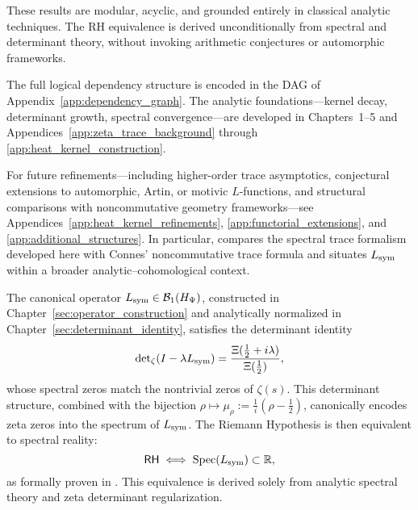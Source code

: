 \medskip

\noindent
These results are modular, acyclic, and grounded entirely in classical analytic techniques. The RH equivalence is derived unconditionally from spectral and determinant theory, without invoking arithmetic conjectures or automorphic frameworks.

\medskip

\noindent
The full logical dependency structure is encoded in the DAG of Appendix~\ref{app:dependency_graph}. The analytic foundations—kernel decay, determinant growth, spectral convergence—are developed in Chapters~1–5 and Appendices~\ref{app:zeta_trace_background} through \ref{app:heat_kernel_construction}.

\medskip

\noindent
For future refinements—including higher-order trace asymptotics, conjectural extensions to automorphic, Artin, or motivic \( L \)-functions, and structural comparisons with noncommutative geometry frameworks—see Appendices~\ref{app:heat_kernel_refinements}, \ref{app:functorial_extensions}, and \ref{app:additional_structures}. In particular,  compares the spectral trace formalism developed here with Connes’ noncommutative trace formula and situates \( L_{\mathrm{sym}} \) within a broader analytic–cohomological context.

\begin{tcolorbox}[colback=gray!2!white, colframe=black!50, title={\textbf{Canonical Equivalence — RH via Spectral Reality}}]
The canonical operator \( L_{\mathrm{sym}} \in \mathcal{B}_1(H_{\Psi}) \), constructed in Chapter~\ref{sec:operator_construction} and analytically normalized in Chapter~\ref{sec:determinant_identity}, satisfies the determinant identity
\[
\det\nolimits_{\zeta}(I - \lambda L_{\mathrm{sym}}) = \frac{\Xi(\tfrac{1}{2} + i\lambda)}{\Xi(\tfrac{1}{2})},
\]
whose spectral zeros match the nontrivial zeros of \( \zeta(s) \). This determinant structure, combined with the bijection \( \rho \mapsto \mu_\rho := \tfrac{1}{i}(\rho - \tfrac{1}{2}) \), canonically encodes zeta zeros into the spectrum of \( L_{\mathrm{sym}} \). The Riemann Hypothesis is then equivalent to spectral reality:
\[
\mathsf{RH} \iff \operatorname{Spec}(L_{\mathrm{sym}}) \subset \mathbb{R},
\]
as formally proven in . This equivalence is derived solely from analytic spectral theory and zeta determinant regularization.
\end{tcolorbox}
